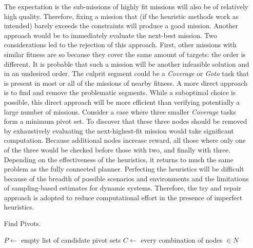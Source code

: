 \documentclass{tamuccthesis}
\begin{document}
The expectation is the sub-missions of highly fit missions will also be of relatively high quality. Therefore, fixing a mission that (if the heuristic methods work as intended) barely exceeds the constraints will produce a good mission. Another approach would be to immediately evaluate the next-best mission. Two considerations led to the rejection of this approach. First, other missions with similar fitness are so because they cover the same amount of targets: the order is different. It is probable that such a mission will be another infeasible solution and in an undesired order. The culprit segment could be a \textit{Coverage} or \textit{Goto} task that is present in most or all of the missions of nearby fitness. A more direct approach is to find and remove the problematic segments. While a suboptimal choice is possible, this direct approach will be more efficient than verifying potentially a large number of missions. Consider a case where three smaller \textit{Coverage} tasks form a minimum pivot set. To discover that these three nodes should be removed by exhaustively evaluating the next-highest-fit mission would take significant computation. Because additional nodes increase reward, all those where only one of the three would be checked before those with two, and finally with three. Depending on the effectiveness of the heuristics, it returns to much the same problem as the fully connected planner. Perfecting the heuristics will be difficult because of the breadth of possible scenarios and environments and the limitations of sampling-based estimates for dynamic systems. Therefore, the try and repair approach is adopted to reduce computational effort in the presence of imperfect heuristics. 


\begin{spacing}{0.5}
\begin{algorithm}[H]
\caption[Find Pivots.]{Find Pivots.}
\label{alg:find_pivots}
$P \leftarrow$ empty list of candidate pivot sets\;
$C \leftarrow$ every combination of nodes $\in N$\;
\end{algorithm}
\end{spacing}
\end{document}
